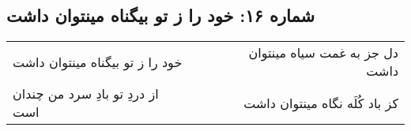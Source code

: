\begin{center}
\section*{شماره ۱۶: خود را ز تو بیگناه مینتوان داشت}
\label{sec:016}
\begin{longtable}{l p{0.5cm} r}
خود را ز تو بیگناه مینتوان داشت
&&
دل جز به غمت سیاه مینتوان داشت
\\
از دردِ تو بادِ سرد من چندان است
&&
کز باد کُلَه نگاه مینتوان داشت
\\
\end{longtable}
\end{center}
